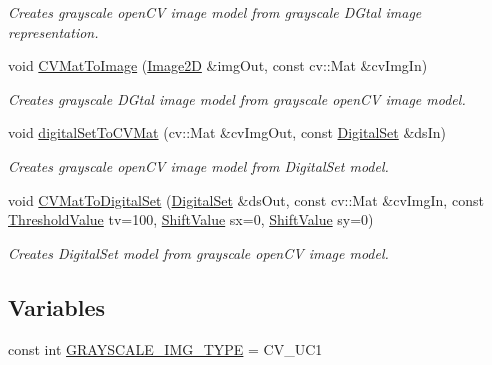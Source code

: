 \begin{DoxyCompactItemize}
\begin{DoxyCompactList}\small\item\em Creates grayscale open\+CV image model from grayscale D\+Gtal image representation. \end{DoxyCompactList}\item 
void \mbox{\hyperlink{namespaceDIPaCUS_1_1Representation_a21b3320f4db6e9be9b4ef3dc09c98afa}{C\+V\+Mat\+To\+Image}} (\mbox{\hyperlink{namespaceDIPaCUS_1_1Representation_ae97917e89f57298fda1626daad9f1733}{Image2D}} \&img\+Out, const cv\+::\+Mat \&cv\+Img\+In)
\begin{DoxyCompactList}\small\item\em Creates grayscale D\+Gtal image model from grayscale open\+CV image model. \end{DoxyCompactList}\item 
void \mbox{\hyperlink{namespaceDIPaCUS_1_1Representation_ad8ad6c44d5f4a4f7033fac84899bb3fa}{digital\+Set\+To\+C\+V\+Mat}} (cv\+::\+Mat \&cv\+Img\+Out, const \mbox{\hyperlink{namespaceDIPaCUS_1_1Representation_a6eca0b4fa262f2d600f11d82ee10b5a6}{Digital\+Set}} \&ds\+In)
\begin{DoxyCompactList}\small\item\em Creates grayscale open\+CV image model from Digital\+Set model. \end{DoxyCompactList}\item 
void \mbox{\hyperlink{namespaceDIPaCUS_1_1Representation_a30987a074b773f7b4091b133a806618d}{C\+V\+Mat\+To\+Digital\+Set}} (\mbox{\hyperlink{namespaceDIPaCUS_1_1Representation_a6eca0b4fa262f2d600f11d82ee10b5a6}{Digital\+Set}} \&ds\+Out, const cv\+::\+Mat \&cv\+Img\+In, const \mbox{\hyperlink{namespaceDIPaCUS_1_1Representation_a85996f90f0c4186ddae15b4f372bf875}{Threshold\+Value}} tv=100, \mbox{\hyperlink{namespaceDIPaCUS_1_1Representation_a66bd167c31ee02704986500ddb462df8}{Shift\+Value}} sx=0, \mbox{\hyperlink{namespaceDIPaCUS_1_1Representation_a66bd167c31ee02704986500ddb462df8}{Shift\+Value}} sy=0)
\begin{DoxyCompactList}\small\item\em Creates Digital\+Set model from grayscale open\+CV image model. \end{DoxyCompactList}\end{DoxyCompactItemize}
\subsection*{Variables}
\begin{DoxyCompactItemize}
\item 
const int \mbox{\hyperlink{namespaceDIPaCUS_1_1Representation_ad86d37ae840297d40c79295d1c7e6e52}{G\+R\+A\+Y\+S\+C\+A\+L\+E\+\_\+\+I\+M\+G\+\_\+\+T\+Y\+PE}} = C\+V\+\_\+U\+C1
\end{DoxyCompactItemize}


